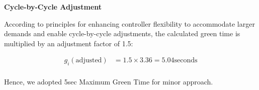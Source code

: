  \textbf{Cycle-by-Cycle Adjustment}

 According to  principles for enhancing controller flexibility to 
 accommodate larger demands and enable cycle-by-cycle adjustments, 
 the calculated green time is multiplied by an adjustment factor of 1.5:

 \begin{align*}
   g_i(\text{adjusted}) &= 1.5 \times 3.36 = 5.04 \text{seconds} \\
 \end{align*}


Hence, we adopted 5sec Maximum Green Time for minor approach.




